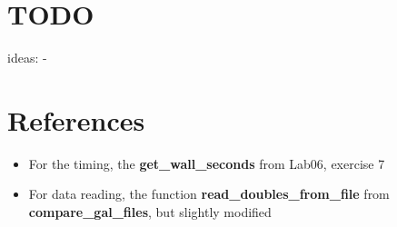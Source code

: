 \documentclass[a4paper]{scrartcl}
\begin{document}
        \section{TODO}
        ideas:
        - 
            

\section{References}
    \begin{itemize}
        \item For the timing, the \textbf{get\_wall\_seconds} from Lab06, exercise 7
        \item For data reading, the function \textbf{read\_doubles\_from\_file} from \textbf{compare\_gal\_files}, but slightly modified
    \end{itemize}
\end{document}
